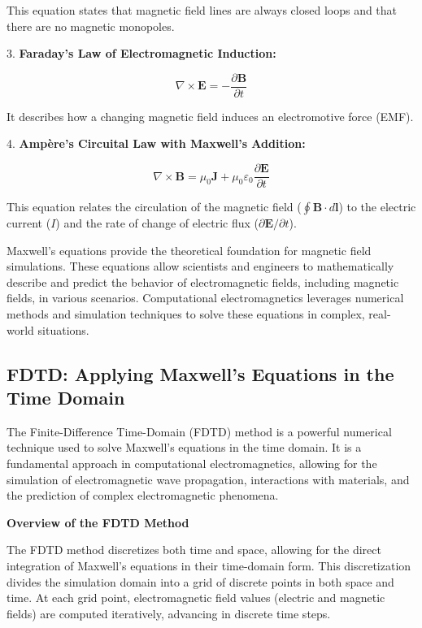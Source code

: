 \documentclass[11pt, a4paper, titlepage]{article}
\begin{document}
This equation states that magnetic field lines are always closed loops and that there are no magnetic monopoles.

3. \textbf{Faraday's Law of Electromagnetic Induction:}

\[
\nabla \times \mathbf{E} = -\frac{\partial \mathbf{B}}{\partial t}
\]

It describes how a changing magnetic field induces an electromotive force (EMF).

4. \textbf{Ampère's Circuital Law with Maxwell's Addition:}

\[
\nabla \times \mathbf{B} = \mu_0 \mathbf{J} + \mu_0 \varepsilon_0 \frac{\partial \mathbf{E}}{\partial t}
\]

This equation relates the circulation of the magnetic field (\(\oint \mathbf{B} \cdot d\mathbf{l}\)) to the electric current (\(I\)) and the rate of change of electric flux (\(\partial \mathbf{E}/\partial t\)). 


Maxwell's equations provide the theoretical foundation for magnetic field simulations. These equations allow scientists and engineers to mathematically describe and predict the behavior of electromagnetic fields, including magnetic fields, in various scenarios. Computational electromagnetics leverages numerical methods and simulation techniques to solve these equations in complex, real-world situations.

\newpage
\subsection{FDTD: Applying Maxwell's Equations in the Time Domain}

The Finite-Difference Time-Domain (FDTD) method is a powerful numerical technique used to solve Maxwell's equations in the time domain. It is a fundamental approach in computational electromagnetics, allowing for the simulation of electromagnetic wave propagation, interactions with materials, and the prediction of complex electromagnetic phenomena.

\textbf{Overview of the FDTD Method}

The FDTD method discretizes both time and space, allowing for the direct integration of Maxwell's equations in their time-domain form. This discretization divides the simulation domain into a grid of discrete points in both space and time. At each grid point, electromagnetic field values (electric and magnetic fields) are computed iteratively, advancing in discrete time steps.
\end{document}
